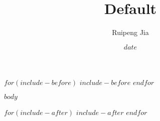 \documentclass{article}
\title{Default}         \let\Title\@title
\author{Ruipeng Jia}    \let\Author\@author
\date{$date$}
\begin{document}
$for(include-before)$  %
$include-before$
$endfor$

$body$

$for(include-after)$
$include-after$
$endfor$
\end{document}
